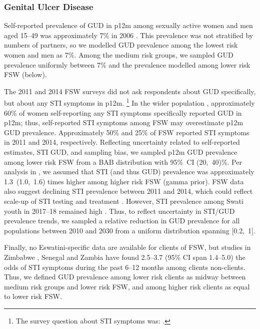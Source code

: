 \subsubsection{Genital Ulcer Disease}\label{mod.par.tm.gud}
Self-reported prevalence of GUD in p12m among sexually active women and men aged 15--49
was approximately 7\% in 2006 \cite[Table~13.14]{SDHS2006}.
This prevalence was not stratified by numbers of partners,
so we modelled GUD prevalence among the lowest risk women and men as 7\%.
Among the medium risk groups, we sampled GUD prevalence uniformly between
7\% and the prevalence modelled among lower risk FSW (below).
\par
The 2011 and 2014 FSW surveys did not ask respondents about GUD specifically,
but about any STI symptoms in p12m.%
\footnote{The survey question about STI symptoms was:
  .}
In the wider population \cite{SDHS2006},
approximately 60\% of women self-reporting any STI symptoms specifically reported GUD in p12m;
thus, self-reported STI symptoms among FSW may overestimate p12m GUD prevalence.
Approximately 50\% and 25\% of FSW reported STI symptoms in 2011 and 2014, respectively.
Reflecting uncertainty related to self-reported estimates, STI \vs GUD, and sampling bias,
we sampled p12m GUD prevalence among lower risk FSW from
a BAB distribution with 95\%~CI (20,~40)\%.
Per analysis in , we assumed that STI (and thus GUD) prevalence was
approximately 1.3~(1.0,~1.6) times higher among higher risk FSW (gamma prior).
FSW data also suggest declining STI prevalence between 2011 and 2014,
which could reflect scale-up of STI testing and treatment \cite{NERCHA2012rep}.
However, STI prevalence among Swati youth in 2017--18 remained high \cite{Jasumback2020}.
Thus, to reflect uncertainty in STI/GUD prevalence trends,
we sampled a relative reduction in GUD prevalence for all populations between 2010 and 2030
from a uniform distribution spanning [0.2,~1].
\par
Finally, no Eswatini-specific data are available for clients of FSW,
but studies in Zimbabwe \cite{Cowan2005}, Senegal \cite{Santo2005} and Zambia \cite{Carrasco2020}
have found 2.5--3.7 (95\% CI span 1.4--5.0) the odds
of STI symptoms during the past 6--12 months among clients \vs non-clients.
Thus, we defined GUD prevalence
among lower risk clients as midway between medium risk groups and lower risk FSW, and
among higher risk clients as equal to lower risk FSW.
